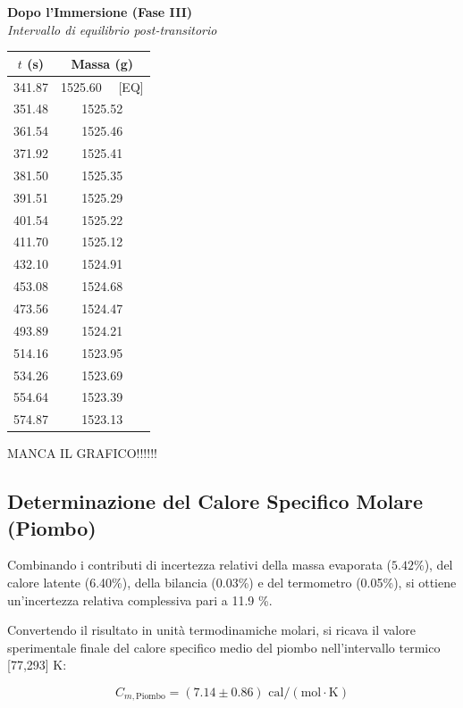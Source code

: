 \documentclass[a4paper,12pt]{article}
\begin{document}
\begin{minipage}[t]{0.58\textwidth}
    \centering
    \textbf{Dopo l'Immersione (Fase III)} \\
    \textit{Intervallo di equilibrio post-transitorio} \\
    \vspace{0.3cm}
    \begin{tabular}{cc}
        \hline
        $t$ (s) & Massa (g) \\ \hline
        341.87 & 1525.60 \ \ [EQ] \\
        351.48 & 1525.52 \\
        361.54 & 1525.46 \\
        371.92 & 1525.41 \\
        381.50 & 1525.35 \\
        391.51 & 1525.29 \\
        401.54 & 1525.22 \\
        411.70 & 1525.12 \\
        432.10 & 1524.91 \\
        453.08 & 1524.68 \\
        473.56 & 1524.47 \\
        493.89 & 1524.21 \\
        514.16 & 1523.95 \\
        534.26 & 1523.69 \\
        554.64 & 1523.39 \\
        574.87 & 1523.13 \\ \hline
    \end{tabular}
    \label{tab:dati_piombo}
\end{minipage}


MANCA IL GRAFICO!!!!!!


\subsection{Determinazione del Calore Specifico Molare (Piombo)}

Combinando i contributi di incertezza relativi della massa evaporata ($5.42\%$), del calore latente (6.40\%),
della bilancia (0.03\%) e del termometro (0.05\%), si ottiene un'incertezza relativa complessiva pari a 11.9 \%.

Convertendo il risultato in unità termodinamiche molari, si ricava il valore sperimentale finale del calore
specifico medio del piombo nell'intervallo termico [77,293] K:

\begin{equation*}
    C_{m, \text{Piombo}} = (7.14 \pm 0.86)\text{ cal}/(\text{mol}\cdot\text{K})
\end{equation*}
\newpage
\end{document}
